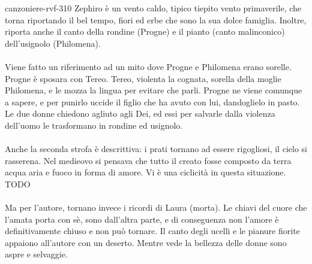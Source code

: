 \documentclass[preview]{standalone}
\begin{document}
\begin{snippet}{canzoniere-rvf-310}
    Zephiro è un vento caldo, tipico tiepito vento primaverile,
    che torna riportando il bel tempo, fiori ed erbe che sono la sua dolce famiglia.
    Inoltre, riporta anche il canto della rondine (Progne) e il pianto (canto malinconico)
    dell'usignolo (Philomena).
    \\\\
    Viene fatto un riferimento ad un mito dove Progne e Philomena erano sorelle.
    Progne è sposara con Tereo. Tereo, violenta la cognata, sorella della moglie Philomena,
    e le mozza la lingua per evitare che parli. Progne ne viene comunque a sapere,
    e per punirlo uccide il figlio che ha avuto con lui, dandoglielo in pasto.
    Le due donne chiedono agliuto agli Dei, ed essi per salvarle dalla violenza dell'uomo
    le trasformano in rondine ed usignolo.
    \\\\
    Anche la seconda strofa è descrittiva: i prati tornano ad essere rigogliosi, il cielo
    si rasserena.
    Nel medieovo si pensava che tutto il creato fosse composto da terra
    acqua aria e fuoco in forma di amore.
    Vi è una ciclicità in questa situazione.
    TODO
    \\\\
    Ma per l'autore, tornano invece i ricordi di Laura (morta).
    Le chiavi del cuore che l'amata porta con sè, sono dall'altra parte, e di conseguenza
    non l'amore è definitivamente chiuso e non può tornare.
    Il canto degli ucelli e le pianure fiorite appaiono all'autore con un deserto.
    Mentre vede la bellezza delle donne sono aspre e selvaggie.
\end{snippet}
\end{document}
